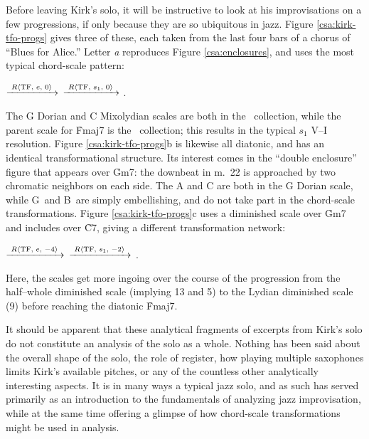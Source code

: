 Before leaving Kirk's solo, it will be instructive to look at his
improvisations on a few \tfo progressions, if only because they are so
ubiquitous in jazz. Figure \ref{csa:kirk-tfo-progs} gives three of these, each
taken from the last four bars of a chorus of ``Blues for Alice.'' 
Letter \emph{a} reproduces Figure \ref{csa:enclosures},
and uses the most typical \tfo chord-scale pattern: \\
{\centering {}
  $\xrightarrow{\text{ \mbox{\ensuremath{R\langle}TF, $e$, $0$\ensuremath{\rangle}} }}$ 
  $\xrightarrow{\text{ \mbox{\ensuremath{R\langle}TF, $s_1$, $0$\ensuremath{\rangle}} }}$ . \par
}
\noindent The G Dorian and C Mixolydian scales are both in the \flat\
collection, while the parent scale for \h{Fmaj7} is the \nat\ collection; this
results in the typical $s_1$ V--I resolution.\fn{csa-11} Figure
\ref{csa:kirk-tfo-progs}b is likewise all diatonic, and has an identical
transformational structure. Its interest comes in the ``double enclosure'' figure
that appears over \h{Gm7}: the downbeat \Bflat in m.~22 is approached by two chromatic
neighbors on each side. The A and C are both in the G Dorian scale, while
G\sharp\ and B\nat\ are simply embellishing, and do not take part in the
chord-scale transformations. Figure \ref{csa:kirk-tfo-progs}c uses a
diminished scale over \h{Gm7} and
includes \Dflat over \h{C7}, giving a different transformation network: \\
{\centering \cst{Gm7}{\flat}{HW dim.}
  $\xrightarrow{\text{ \mbox{\ensuremath{R\langle}TF, $e$, $-4$\ensuremath{\rangle}} }}$ 
  $\xrightarrow{\text{ \mbox{\ensuremath{R\langle}TF, $s_1$, $-2$\ensuremath{\rangle}} }}$
  . \par
}
\noindent Here, the scales get more ingoing over the course of the progression
from the half--whole diminished scale (implying \flat{}13 and \flat{}5) to the
Lydian diminished scale (\flat{}9) before reaching the diatonic \h{Fmaj7}.

It should be apparent that these analytical fragments of excerpts from Kirk's
solo do not constitute an analysis of the solo as a whole. Nothing has been
said about the overall shape of the solo, the role of register, how playing
multiple saxophones limits Kirk's available pitches, or any of the countless
other analytically interesting aspects. It is in many ways a typical jazz
solo, and as such has served primarily as an introduction to the fundamentals
of analyzing jazz improvisation, while at the same time offering a glimpse of
how chord-scale transformations might be used in analysis.

